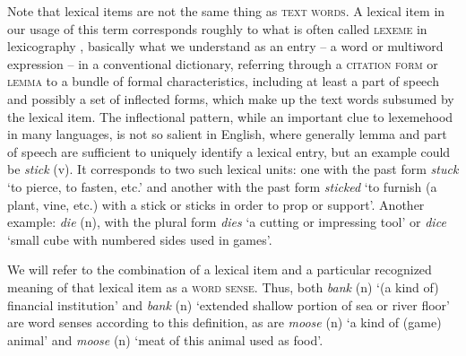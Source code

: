\documentclass[output=paper]{langsci/langscibook}
\begin{document}
Note that lexical items are not the same thing as \textsc{text
  words}. A lexical item in our usage of this term corresponds roughly
to what is often called \textsc{lexeme} in lexicography
\citep[e.g.,][]{matthews-1974}, basically what we understand as an entry
-- a word or multiword expression -- in a conventional dictionary,
referring through a \textsc{citation form} or \textsc{lemma} to a
bundle of formal characteristics, including at least a part of speech
and possibly a set of inflected forms, which make up the text words
subsumed by the lexical item. The inflectional pattern, while an
important clue to lexemehood in many languages, is not so salient in
English, where generally lemma and part of speech are sufficient to
uniquely identify a lexical entry, but an example could be
\emph{stick} (v).  It corresponds to two such lexical units: one with
the past form \emph{stuck} `to pierce, to fasten, etc.' and another
with the past form \emph{sticked} `to furnish (a plant, vine, etc.)
with a stick or sticks in order to prop or support'. Another example: \emph{die}
(n), with the plural form \emph{dies} `a cutting or impressing tool'
or \emph{dice} `small cube with numbered sides used in games'.

We will refer to the combination of a lexical item and a particular
recognized meaning of that lexical item as a \textsc{word sense}. Thus,
both \emph{bank} (n) `(a kind of) financial institution' and
\emph{bank} (n) `extended shallow portion of sea or river floor' are word
senses according to this definition, as are \emph{moose} (n) `a kind of
(game) animal' and \emph{moose} (n) `meat of this animal used as food'.
\end{document}
